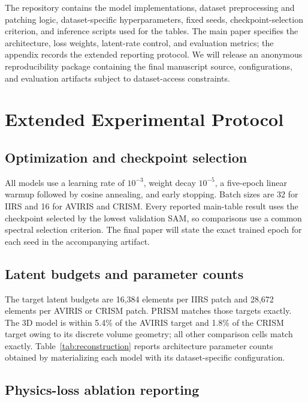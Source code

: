 \documentclass{article}
\begin{document}
The repository contains the model implementations, dataset preprocessing and patching logic, dataset-specific hyperparameters, fixed seeds, checkpoint-selection criterion, and inference scripts used for the tables. The main paper specifies the architecture, loss weights, latent-rate control, and evaluation metrics; the appendix records the extended reporting protocol. We will release an anonymous reproducibility package containing the final manuscript source, configurations, and evaluation artifacts subject to dataset-access constraints.




\appendix
\section{Extended Experimental Protocol}

\subsection{Optimization and checkpoint selection}

All models use a learning rate of $10^{-3}$, weight decay $10^{-5}$, a five-epoch linear warmup followed by cosine annealing, and early stopping. Batch sizes are 32 for IIRS and 16 for AVIRIS and CRISM. Every reported main-table result uses the checkpoint selected by the lowest validation SAM, so comparisons use a common spectral selection criterion. The final paper will state the exact trained epoch for each seed in the accompanying artifact.

\subsection{Latent budgets and parameter counts}

The target latent budgets are 16,384 elements per IIRS patch and 28,672 elements per AVIRIS or CRISM patch. PRISM matches those targets exactly. The 3D model is within 5.4\% of the AVIRIS target and 1.8\% of the CRISM target owing to its discrete volume geometry; all other comparison cells match exactly. Table~\ref{tab:reconstruction} reports architecture parameter counts obtained by materializing each model with its dataset-specific configuration.

\subsection{Physics-loss ablation reporting}
\end{document}
